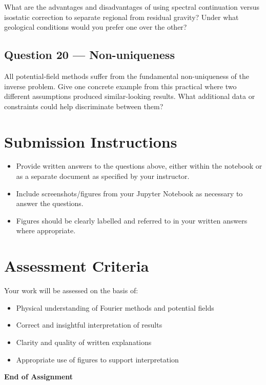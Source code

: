 \documentclass[11pt]{article}
\begin{document}
What are the advantages and disadvantages of using spectral continuation versus
isostatic correction to separate regional from residual gravity?  Under what
geological conditions would you prefer one over the other?

\subsection*{Question 20 — Non-uniqueness}

All potential-field methods suffer from the fundamental non-uniqueness of the
inverse problem.  Give one concrete example from this practical where two
different assumptions produced similar-looking results.  What additional data or
constraints could help discriminate between them?

\section*{Submission Instructions}

\begin{itemize}
  \item Provide written answers to the questions above, either within the notebook or as a separate document as specified by your instructor.
  \item Include screenshots/figures from your Jupyter Notebook as necessary to answer the questions.
  \item Figures should be clearly labelled and referred to in your written answers where appropriate.
\end{itemize}

\section*{Assessment Criteria}

Your work will be assessed on the basis of:
\begin{itemize}
  \item Physical understanding of Fourier methods and potential fields
  \item Correct and insightful interpretation of results
  \item Clarity and quality of written explanations
  \item Appropriate use of figures to support interpretation
\end{itemize}

\vspace{1em}
\noindent\textbf{End of Assignment}
\end{document}
